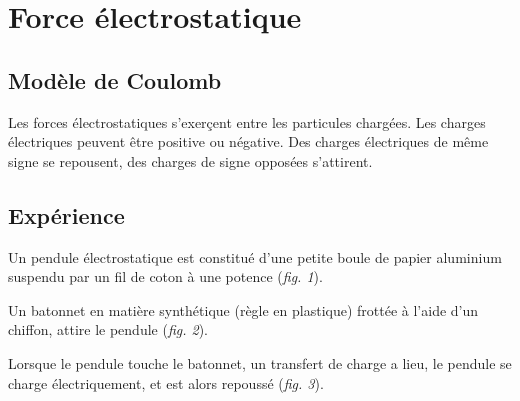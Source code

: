 
\section{Force électrostatique}
%
\subsection{Modèle de Coulomb}
Les forces électrostatiques s'exerçent entre les particules chargées. Les charges électriques peuvent être positive ou négative.
Des charges électriques de même signe se repousent, des charges de signe opposées s'attirent.

\subsection{Expérience}
Un pendule électrostatique est constitué d'une petite boule de papier aluminium suspendu par un fil de coton à une potence ({\it fig. 1}).
 
Un batonnet en matière synthétique (règle en plastique) frottée à l'aide d'un chiffon, attire le pendule ({\it fig. 2}).

Lorsque le pendule touche le batonnet, un transfert de charge a lieu, le pendule se charge électriquement, et est alors repoussé ({\it fig. 3}).

